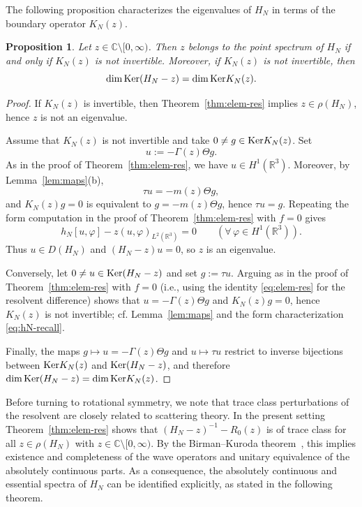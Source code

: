 \documentclass[a4paper,11pt]{article}
\numberwithin{equation}{section}
\def\re{\mathbb{R}}
\def\co{\mathbb{C}}
\renewcommand{\ker}{\text{\rm Ker}}
\newtheorem{prop}[thm]{Proposition}
\theoremstyle{definition}
\theoremstyle{remark}
\begin{document}
The following proposition characterizes the eigenvalues of $H_N$ in terms of
the boundary operator $K_N(z)$.

\begin{prop}\label{prop:eig-cond}
Let $z\in\co\setminus[0,\infty)$.
Then $z$ belongs to the point spectrum of $H_N$ if and only if $K_N(z)$ is not
invertible.
Moreover, if $K_N(z)$ is not invertible, then
\[
\dim\ker(H_N-z)=\dim\ker K_N(z).
\]
\end{prop}

\begin{proof}
If $K_N(z)$ is invertible, then Theorem~\ref{thm:elem-res} implies
$z\in\rho(H_N)$, hence $z$ is not an eigenvalue.

Assume that $K_N(z)$ is not invertible and take $0\ne g\in\ker K_N(z)$.
Set
$$
u:=-\Gamma(z)\Theta g.
$$
As in the proof of Theorem~\ref{thm:elem-res}, we have $u\in H^1(\re^3)$.
Moreover, by Lemma~\ref{lem:maps}(b),
$$
\tau u=-m(z)\Theta g,
$$
and $K_N(z)g=0$ is equivalent to $g=-m(z)\Theta g$, hence $\tau u=g$.
Repeating the form computation in the proof of Theorem~\ref{thm:elem-res} with $f=0$
gives
$$
h_N[u,\varphi]-z(u,\varphi)_{L^2(\re^3)}=0
\qquad(\forall\,\varphi\in H^1(\re^3)).
$$
Thus $u\in D(H_N)$ and $(H_N-z)u=0$, so $z$ is an eigenvalue.

Conversely, let $0\ne u\in\ker(H_N-z)$ and set $g:=\tau u$.
Arguing as in the proof of Theorem~\ref{thm:elem-res} with $f=0$ (i.e., using the
identity \eqref{eq:elem-res} for the resolvent difference) shows that
$u=-\Gamma(z)\Theta g$ and $K_N(z)g=0$, hence $K_N(z)$ is not invertible; cf.
Lemma~\ref{lem:maps} and the form characterization \eqref{eq:hN-recall}.

Finally, the maps $g\mapsto u=-\Gamma(z)\Theta g$ and $u\mapsto\tau u$ restrict to
inverse bijections between $\ker K_N(z)$ and $\ker(H_N-z)$, and therefore
$\dim\ker(H_N-z)=\dim\ker K_N(z)$.
\end{proof}

Before turning to rotational symmetry, we note that trace class perturbations of
the resolvent are closely related to scattering theory.
In the present setting Theorem~\ref{thm:elem-res} shows that
$(H_N-z)^{-1}-R_0(z)$ is of trace class for all $z\in\rho(H_N)$ with
$z\in\co\setminus[0,\infty)$.
By the Birman--Kuroda theorem~\cite{ReedSimonIII}, this implies existence and
completeness of the wave operators and unitary equivalence of the absolutely
continuous parts.
As a consequence, the absolutely continuous and essential spectra of $H_N$ can
be identified explicitly, as stated in the following theorem.
\end{document}
